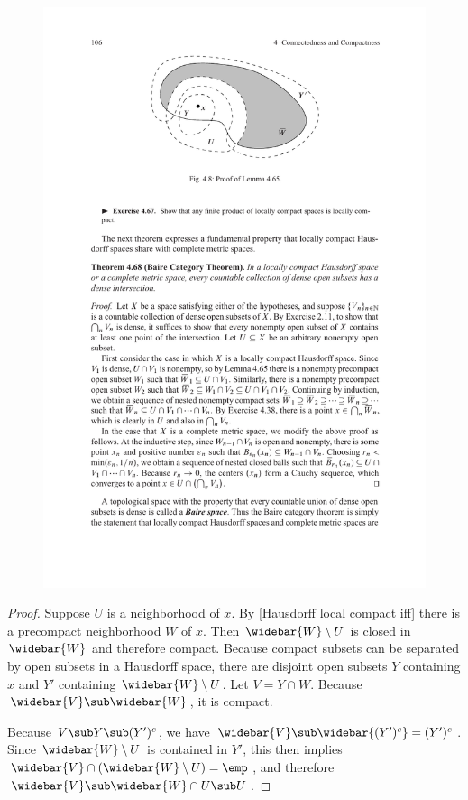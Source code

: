 \begin{figure}[htbp]
\centering
\includegraphics{pictures/local-compact}
\end{figure}
\begin{proof}
Suppose $U$ is a neighborhood of $x$. By \cref{Hausdorff local compact iff} there is a precompact neighborhood $W$ of $x$. Then $\widebar{W}\setminus U$ is closed in $\widebar{W}$ and therefore compact. Because compact subsets can be separated by open subsets in a Hausdorff space, there are disjoint open subsets $Y$ containing $x$ and $Y'$ containing $\widebar{W}\setminus U$. Let $V=Y\cap W$. Because $\widebar{V}\sub\widebar{W}$, it is compact.\par
Because $V\sub Y\sub(Y')^c$, we have $\widebar{V}\sub\widebar{(Y')^c}=(Y')^c$. Since $\widebar{W}\setminus U$ is contained in $Y'$, this then implies $\widebar{V}\cap(\widebar{W}\setminus U)=\emp$, and therefore $\widebar{V}\sub\widebar{W}\cap U\sub U$.
\end{proof}
